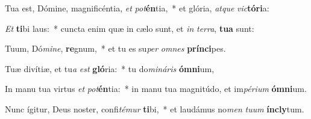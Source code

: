 \item Tua est, Dómine, magnificéntia, \textit{et} \textit{pot}\textbf{én}tia,~* et glória, \textit{at}\textit{que} \textit{vic}\textbf{tó}\textbf{ri}a:
\item \textit{Et} \textbf{ti}bi laus:~* cuncta enim quæ in cælo sunt, et \textit{in} \textit{ter}\textit{ra}, \textbf{tu}\textbf{a} sunt:
\item Tuum, Dó\textit{mi}\textit{ne}, \textbf{re}gnum,~* et tu es su\textit{per} \textit{om}\textit{nes} \textbf{prín}\textbf{ci}pes.
\item Tuæ divítiæ, et tu\textit{a} \textit{est} \textbf{gló}ria:~* tu do\textit{mi}\textit{ná}\textit{ris} \textbf{óm}\textbf{ni}um,
\item In manu tua virtus \textit{et} \textit{pot}\textbf{én}tia:~* in manu tua magnitúdo, et im\textit{pé}\textit{ri}\textit{um} \textbf{óm}\textbf{ni}um.
\item Nunc ígitur, Deus noster, confi\textit{té}\textit{mur} \textbf{ti}bi,~* et laudámus no\textit{men} \textit{tu}\textit{um} \textbf{ín}\textbf{cly}tum.
